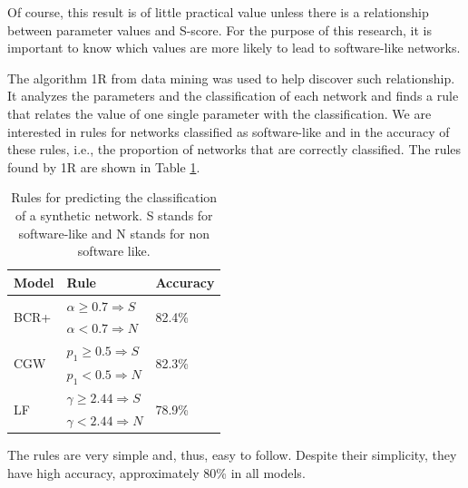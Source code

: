 Of course, this result is of little practical value unless there is a
relationship between parameter values and S-score. For the purpose of this
research, it is important to know which values are more likely to lead to
software-like networks.

The algorithm 1R from data mining was used to help discover such relationship.
It analyzes the parameters and the classification of each network and finds a
rule that relates the value of one single parameter with the classification. We
are interested in rules for networks classified as software-like and in the
accuracy of these rules, i.e., the proportion of networks that are correctly
classified. The rules found by 1R are shown in Table \ref{tab:rules}.

\begin{table}
\caption{Rules for predicting the classification of a synthetic network. S
stands for software-like and N stands for non software like.}
\centering
\begin{tabular}{|l|l|l|}
\hline
Model & Rule & Accuracy \\
\hline 
\hline
\multirow{2}{*}{BCR+}
     & $\alpha \ge 0.7 \Rightarrow S$ & \multirow{2}{*}{82.4\%}  \\ 
     & $\alpha < 0.7 \Rightarrow N$ & \\ 
\hline
\multirow{2}{*}{CGW}
     & $p_1 \ge 0.5 \Rightarrow S$ & \multirow{2}{*}{82.3\%} \\  
     & $p_1 < 0.5 \Rightarrow N$ & \\  
\hline
\multirow{2}{*}{LF}   
     & $\gamma \ge 2.44 \Rightarrow S$ & \multirow{2}{*}{78.9\%} \\ 
     & $\gamma < 2.44 \Rightarrow N$ & \\ 
\hline
\end{tabular}
\label{tab:rules}
\end{table}

The rules are very simple and, thus, easy to follow. Despite their simplicity,
they have high accuracy, approximately 80\% in all models.  

%


%
%

